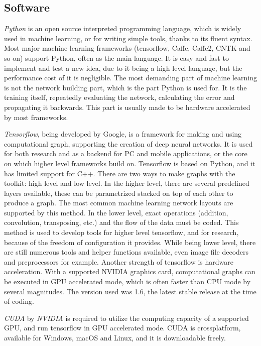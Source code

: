 \documentclass[12pt]{report}
\begin{document}
\subsection{Software}
\textit{Python} is an open source interpreted programming language, which is widely used in machine learning, or for writing simple tools, thanks to its fluent syntax. Most major machine learning frameworks (tensorflow, Caffe, Caffe2, CNTK and so on) support Python, often as the main language. It is easy and fast to implement and test a new idea, due to it being a high level language, but the performance cost of it is negligible. The most demanding part of machine learning is not the network building part, which is the part Python is used for. It is the training itself, repeatedly evaluating the network, calculating the error and propagating it backwards. This part is usually made to be hardware accelerated by most frameworks.

\textit{Tensorflow}, being developed by Google, is a framework for making and using computational graph, supporting the creation of deep neural networks. It is used for both research and as a backend for PC and mobile applications, or the core on which higher level frameworks build on. Tensorflow is based on Python, and it has limited support for C++. There are two ways to make graphs with the toolkit: high level and low level. In the higher level, there are several predefined layers available, these can be parametrized stacked on top of each other to produce a graph. The most common machine learning network layouts are supported by this method. In the lower level, exact operations (addition, convolution, transposing, etc.) and the flow of the data must be coded. This method is used to develop tools for higher level tensorflow, and for research, because of the freedom of configuration it provides. While being lower level, there are still numerous tools and helper functions available, even image file decoders and preprocessors for example. Another strength of tensorflow is hardware acceleration. With a supported NVIDIA graphics card, computational graphs can be executed in GPU accelerated mode, which is often faster than CPU mode by several magnitudes. The version used was 1.6, the latest stable release at the time of coding.

\textit{CUDA} by \textit{NVIDIA} is required to utilize the computing capacity of a supported GPU, and run tensorflow in GPU accelerated mode. CUDA is crossplatform, available for Windows, macOS and Linux, and it is downloadable freely.
\end{document}
